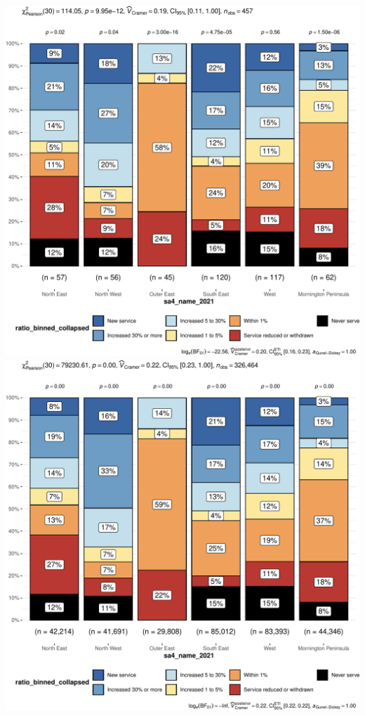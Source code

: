 \documentclass[preprint, 3p,
authoryear]{elsarticle} %
\begin{document}
\includegraphics{ReynoldsCurrieQu2024_files/figure-latex/Greater_Melbourne_2021_needs_gap_SA4_service_change-1.pdf}
\includegraphics{ReynoldsCurrieQu2024_files/figure-latex/Greater_Melbourne_2021_needs_gap_SA4_service_change-2.pdf}
\end{document}
